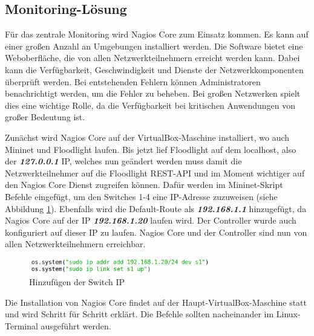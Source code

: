 \documentclass[fontsize=12pt,paper=a4,open=any,parskip=half,
  twoside=false,toc=listof,toc=bibliography,fleqn,leqno,
  captions=nooneline,captions=tableabove,british]{scrbook}
\begin{document}
\subsection{Monitoring-Lösung}
Für das zentrale Monitoring wird Nagios Core zum Einsatz kommen. Es kann auf einer großen Anzahl an Umgebungen installiert werden. Die Software bietet eine Weboberfläche, die von allen Netzwerkteilnehmern erreicht werden kann. Dabei kann die Verfügbarkeit, Geschwindigkeit und Dienste der Netzwerkkomponenten überprüft werden. Bei entstehenden Fehlern können Administratoren benachrichtigt werden, um die Fehler zu beheben. Bei großen Netzwerken spielt dies eine wichtige Rolle, da die Verfügbarkeit bei kritischen Anwendungen von großer Bedeutung ist.\par
Zunächst wird Nagios Core auf der VirtualBox-Maschine installiert, wo auch Mininet und Floodlight laufen. Bis jetzt lief Floodlight auf dem localhost, also der \textit{\textbf{127.0.0.1}} IP, welches nun geändert werden muss damit die Netzwerkteilnehmer auf die Floodlight REST-API und im Moment wichtiger auf den Nagios Core Dienst zugreifen können. Dafür werden im Mininet-Skript Befehle eingefügt, um den Switches 1-4 eine IP-Adresse zuzuweisen (siehe Abbildung \ref{switch}). Ebenfalls wird die Default-Route als \textit{\textbf{192.168.1.1}} hinzugefügt, da Nagios Core auf der IP \textit{\textbf{192.168.1.20}} laufen wird. Der Controller wurde auch konfiguriert auf dieser IP zu laufen. Nagios Core und der Controller sind nun von allen Netzwerkteilnehmern erreichbar.

\begin{figure}[H]
 \centering
 \includegraphics[width=0.7\textwidth]{Bilder/switch}
 \captionsetup{justification=centering, margin=2cm}
 \caption{Hinzufügen der Switch IP}
 \label{switch}
\end{figure}
 
Die Installation von Nagios Core findet auf der Haupt-VirtualBox-Maschine statt und wird Schritt für Schritt erklärt. Die Befehle sollten nacheinander im Linux-Terminal ausgeführt werden.

\newlength\myboxwidth

\setlength{\myboxwidth}{\dimexpr\textwidth-2\fboxsep}
\end{document}
